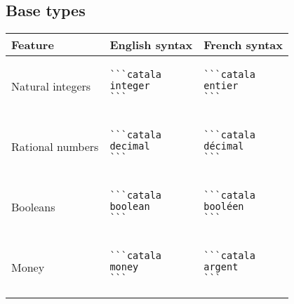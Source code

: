 \documentclass[a3paper,landscape]{article}
\begin{document}
\begin{multicols*}{2}
\section*{Base types}
\begin{center}
\begin{tabular}{p{}p{}p{}}
\toprule
Feature&English syntax&French syntax\\\midrule
Natural integers&
\vspace*{-1.7em}
\begin{verbatim}
```catala
integer
```
\end{verbatim}
\vspace*{-1.7em}
&
\vspace*{-1.7em}
\begin{verbatim}
```catala
entier
```
\end{verbatim}
\vspace*{-1.7em}
\\
Rational numbers&
\vspace*{-1.7em}
\begin{verbatim}
```catala
decimal
```
\end{verbatim}
\vspace*{-1.7em}
&
\vspace*{-1.7em}
\begin{verbatim}
```catala
décimal
```
\end{verbatim}
\vspace*{-1.7em}
\\
Booleans&
\vspace*{-1.7em}
\begin{verbatim}
```catala
boolean
```
\end{verbatim}
\vspace*{-1.7em}
&
\vspace*{-1.7em}
\begin{verbatim}
```catala
booléen
```
\end{verbatim}
\vspace*{-1.7em}
\\
Money&
\vspace*{-1.7em}
\begin{verbatim}
```catala
money
```
\end{verbatim}
\vspace*{-1.7em}
&
\vspace*{-1.7em}
\begin{verbatim}
```catala
argent
```
\end{verbatim}

\end{tabular}
\end{center}
\end{multicols*}
\end{document}

